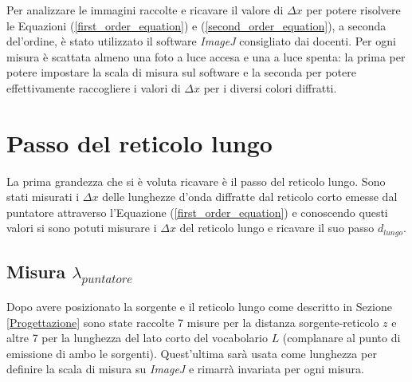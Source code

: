 \documentclass{article}
\begin{document}
\vspace{3mm}

Per analizzare le immagini raccolte e ricavare il valore di $\Delta x$ per potere risolvere le Equazioni (\ref{first_order_equation}) e (\ref{second_order_equation}), a seconda del'ordine, è stato utilizzato il software \textit{ImageJ} consigliato dai docenti. Per ogni misura è scattata almeno una foto a luce accesa e una a luce spenta: la prima per potere impostare la scala di misura sul software e la seconda per potere effettivamente raccogliere i valori di $\Delta x$ per i diversi colori diffratti.

\clearpage

\section{Passo del reticolo lungo}

La prima grandezza che si è voluta ricavare è il passo del reticolo lungo. Sono stati misurati i $\Delta x$ delle lunghezze d'onda diffratte dal reticolo corto emesse dal puntatore attraverso l'Equazione (\ref{first_order_equation}) e conoscendo questi valori si sono potuti misurare i $\Delta x$ del reticolo lungo e ricavare il suo passo $d_{lungo}$.

\subsection{Misura \textrm{$\lambda_{puntatore}$}} \label{3.1}
Dopo avere posizionato la sorgente e il reticolo lungo come descritto in Sezione \ref{Progettazione} sono state raccolte 7 misure per la distanza sorgente-reticolo $z$ e altre 7 per la lunghezza del lato corto del vocabolario $L$ (complanare al punto di emissione di ambo le sorgenti). Quest'ultima sarà usata come lunghezza per definire la scala di misura su \textit{ImageJ} e rimarrà invariata per ogni misura. 
\end{document}
